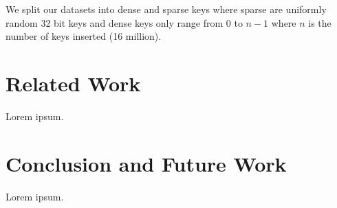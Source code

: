 \documentclass[acmtog, nonacm]{acmart}
\begin{document}
We split our datasets into dense and sparse keys where sparse are uniformly random 32 bit keys and dense keys only
range from $0$ to $n-1$ where $n$ is the number of keys inserted (16 million).

\section{Related Work}

Lorem ipsum.

\section{Conclusion and Future Work}

Lorem ipsum.



\end{document}
